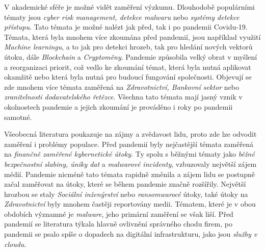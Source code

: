 V akademické sféře je možné vidět zaměření výzkumu.
Dlouhodobě populárními tématy jsou \textit{cyber risk management, detekce malwaru} nebo \textit{systémy detekce přístupu}.\cite{KUMAR2022102821}
Tato témata je možné nalézt jak před, tak i po pandemii Covidu-19.
Témata, která byla mnohem více zkoumána před pandemií, jsou například využití \textit{Machine learningu}, a to jak pro detekci hrozeb, tak pro hledání nových vektorů útoku, dále \textit{Blockchain} a \textit{Cryptoměny}.\cite{KUMAR2022102821}
Pandemie způsobila velký obrat v myšlení a reorganizaci priorit, což vedlo ke zkoumání témat, která byla nutná aplikovat okamžitě nebo která byla nutná pro budoucí fungování společnosti.
Objevují se zde mnohem více témata zaměřená na \textit{Zdravotnictví, Bankovní sektor} nebo \textit{zranitelnosti dodavatelského řetězce}.\cite{KUMAR2022102821}
Všechna tato témata mají jasný vznik v okolnostech pandemie a jejich zkoumání je prováděno i roky po pandemii samotné.

Všeobecná literatura poukazuje na zájmy a zvědavost lidu, proto zde lze odvodit zaměření i problémy populace.
Před pandemií byly nejčastější témata zaměřená na \textit{finančně zaměřené kybernetické útoky}.
Ty spolu s běžnými tématy jako \textit{běžné bezpečnostní slabiny, úniky dat} a \textit{malwarové incidenty}, vzbuzovaly největší zájem médií.\cite{KUMAR2022102821}
Pandemie nicméně tato témata rapidně změnila a zájem lidu se postupně začal zaměřovat na útoky, které se během pandemie značně rozšířily.
Největší hrozbou se staly \textit{Sociální inženýrství} nebo \textit{ransomwarocé} útoky, také útoky na \textit{Zdravotnictví} byly mnohem častěji reportovány medii.
Tématem, které je v obou obdobích významné je \textit{malware}, jeho primární zaměření se však liší.
Před pandemií se literatura týkala hlavně ovlivnění správného chodu firem, po pandemii se psalo spíše o dopadech na digitální infrastrukturu, jako jsou \textit{služby v cloudu}.

